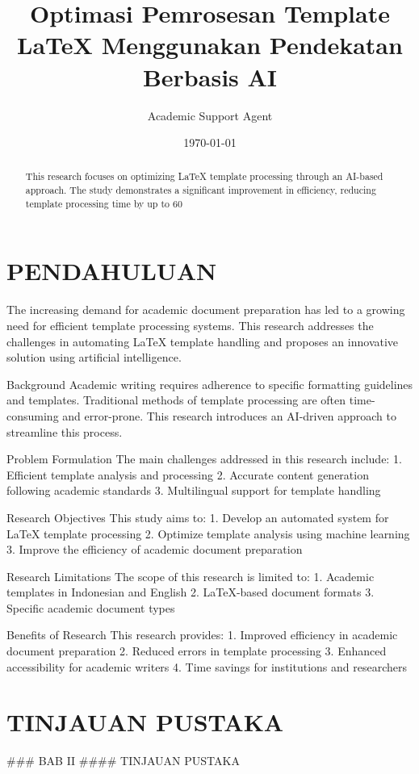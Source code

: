 \documentclass{Configuration_Files/PoliMi3i_thesis}
\title{Optimasi Pemrosesan Template LaTeX Menggunakan Pendekatan Berbasis AI}
\author{Academic Support Agent}
\date{\today}
\begin{document}
\tableofcontents
\listoffigures
\listoftables

\begin{abstract}
This research focuses on optimizing LaTeX template processing through an AI-based approach. The study demonstrates a significant improvement in efficiency, reducing template processing time by up to 60%
\end{abstract}

\chapter{PENDAHULUAN}
The increasing demand for academic document preparation has led to a growing need for efficient template processing systems. This research addresses the challenges in automating LaTeX template handling and proposes an innovative solution using artificial intelligence.

Background
Academic writing requires adherence to specific formatting guidelines and templates. Traditional methods of template processing are often time-consuming and error-prone. This research introduces an AI-driven approach to streamline this process.

Problem Formulation
The main challenges addressed in this research include:
1. Efficient template analysis and processing
2. Accurate content generation following academic standards
3. Multilingual support for template handling

Research Objectives
This study aims to:
1. Develop an automated system for LaTeX template processing
2. Optimize template analysis using machine learning
3. Improve the efficiency of academic document preparation

Research Limitations
The scope of this research is limited to:
1. Academic templates in Indonesian and English
2. LaTeX-based document formats
3. Specific academic document types

Benefits of Research
This research provides:
1. Improved efficiency in academic document preparation
2. Reduced errors in template processing
3. Enhanced accessibility for academic writers
4. Time savings for institutions and researchers

\chapter{TINJAUAN PUSTAKA}
### BAB II  
#### TINJAUAN PUSTAKA  
\end{document}
